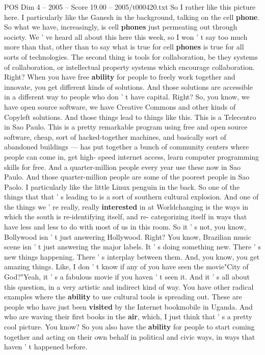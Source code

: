 \begin{textsample}{POS Dim 4 – 2005 – Score 19.00 – 2005/t000420.txt}
So I rather like this picture here.
I particularly like the Ganesh in the background, talking on the cell \textbf{phone}.
So what we have, increasingly, is cell \textbf{phones} just permeating out through society.
We ' ve heard all about this here this week, so I won ' t say too much more than that, other than to say what is true for cell \textbf{phones} is true for all sorts of technologies.
The second thing is tools for collaboration, be they systems of collaboration, or intellectual property systems which encourage collaboration.
Right?
When you have free \textbf{ability} for people to freely work together and innovate, you get different kinds of solutions.
And those solutions are accessible in a different way to people who don ' t have capital.
Right?
So, you know, we have open source software, we have Creative Commons and other kinds of Copyleft solutions.
And those things lead to things like this.
This is a Telecentro in Sao Paulo.
This is a pretty remarkable program using free and open source software, cheap, sort of hacked-together machines, and basically sort of abandoned buildings — has put together a bunch of community centers where people can come in, get high- speed internet access, learn computer programming skills for free.
And a quarter-million people every year use these now in Sao Paulo.
And those quarter-million people are some of the poorest people in Sao Paolo.
I particularly like the little Linux penguin in the back.
So one of the things that that ' s leading to is a sort of southern cultural explosion.
And one of the things we ' re really, really \textbf{interested} in at Worldchanging is the ways in which the south is re-identifying itself, and re- categorizing itself in ways that have less and less to do with most of us in this room.
So it ' s not, you know, Bollywood isn ' t just answering Hollywood.
Right?
You know, Brazilian music scene isn ' t just answering the major labels.
It ' s doing something new.
There ' s new things happening.
There ' s interplay between them.
And, you know, you get amazing things.
Like, I don ' t know if any of you have seen the movie"City of God?"Yeah, it ' s a fabulous movie if you haven ' t seen it.
And it ' s all about this question, in a very artistic and indirect kind of way.
You have other radical examples where the \textbf{ability} to use cultural tools is spreading out.
These are people who have just been \textbf{visited} by the Internet bookmobile in Uganda.
And who are waving their first books in the \textbf{air}, which, I just think that ' s a pretty cool picture.
You know?
So you also have the \textbf{ability} for people to start coming together and acting on their own behalf in political and civic ways, in ways that haven ' t happened before.

\end{textsample}
